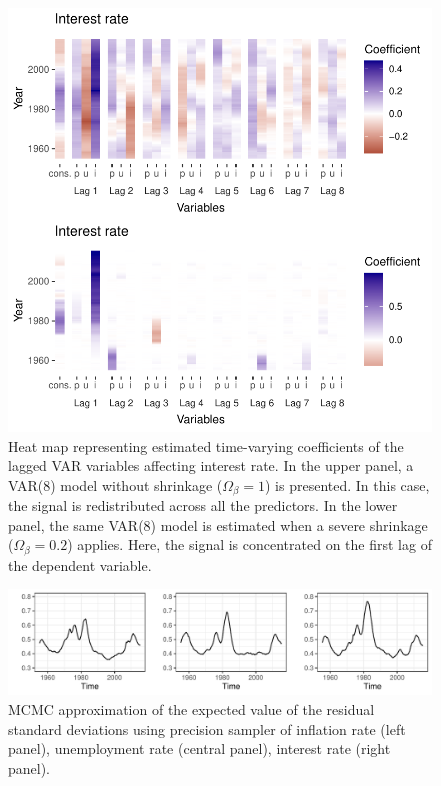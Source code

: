 \documentclass[
  12pt,
]{book}
\theoremstyle{break}
\theoremstyle{nonumberplain}
\begin{document}
\begin{figure}[H]

{\centering \includegraphics{Dynamic-Shrinkage-in-Bayesian-Structural-Time-Series-and-Vector-Autoregressive-Models_files/figure-latex/myfig74-1} 

}

\caption{Heat map representing estimated time-varying coefficients of the lagged VAR variables affecting interest rate. In the upper panel, a VAR(8) model without shrinkage ($\Omega_\beta=1$) is presented. In this case, the signal is redistributed across all the predictors. In the lower panel, the same VAR(8) model is estimated when a severe shrinkage ($\Omega_\beta=0.2$) applies. Here, the signal is concentrated on the first lag of the dependent variable.}\label{fig:myfig74}
\end{figure}

\begin{figure}[H]

{\centering \includegraphics{Dynamic-Shrinkage-in-Bayesian-Structural-Time-Series-and-Vector-Autoregressive-Models_files/figure-latex/myfig502-1} 

}

\caption{MCMC approximation of the expected value of the residual standard deviations using precision sampler of inflation rate (left panel), unemployment rate (central panel), interest rate (right panel).}\label{fig:myfig502}
\end{figure}
\end{document}

